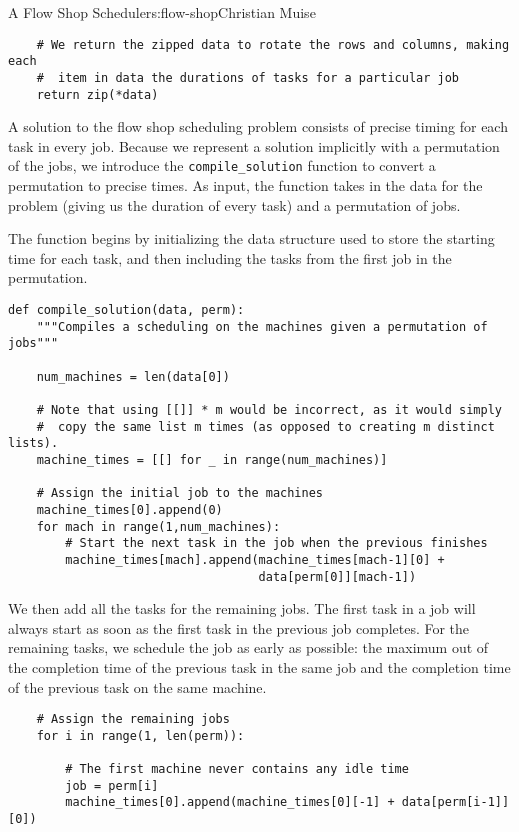 \begin{aosachapter}{A Flow Shop Scheduler}{s:flow-shop}{Christian Muise}
\begin{verbatim}
    # We return the zipped data to rotate the rows and columns, making each
    #  item in data the durations of tasks for a particular job
    return zip(*data)
\end{verbatim}

\label{compiling-solutions}

A solution to the flow shop scheduling problem consists of precise
timing for each task in every job. Because we represent a solution
implicitly with a permutation of the jobs, we introduce the
\texttt{compile\_solution} function to convert a permutation to precise
times. As input, the function takes in the data for the problem (giving
us the duration of every task) and a permutation of jobs.

The function begins by initializing the data structure used to store the
starting time for each task, and then including the tasks from the first
job in the permutation.

\begin{verbatim}
def compile_solution(data, perm):
    """Compiles a scheduling on the machines given a permutation of jobs"""

    num_machines = len(data[0])

    # Note that using [[]] * m would be incorrect, as it would simply
    #  copy the same list m times (as opposed to creating m distinct lists).
    machine_times = [[] for _ in range(num_machines)]

    # Assign the initial job to the machines
    machine_times[0].append(0)
    for mach in range(1,num_machines):
        # Start the next task in the job when the previous finishes
        machine_times[mach].append(machine_times[mach-1][0] +
                                   data[perm[0]][mach-1])
\end{verbatim}

We then add all the tasks for the remaining jobs. The first task in a
job will always start as soon as the first task in the previous job
completes. For the remaining tasks, we schedule the job as early as
possible: the maximum out of the completion time of the previous task in
the same job and the completion time of the previous task on the same
machine.

\begin{verbatim}
    # Assign the remaining jobs
    for i in range(1, len(perm)):

        # The first machine never contains any idle time
        job = perm[i]
        machine_times[0].append(machine_times[0][-1] + data[perm[i-1]][0])


\end{verbatim}
\end{aosachapter}
